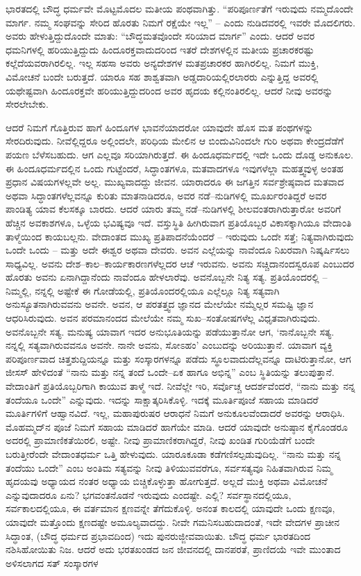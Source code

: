 ಭಾರತದಲ್ಲಿ ಬೌದ್ಧ ಧರ್ಮವೇ ಮೊಟ್ಟಮೊದಲ ಮತೀಯ ಪಂಥವಾಗಿತ್ತು. “ಪರಿಪೂರ್ಣತೆಗೆ ಇರುವುದು ನಮ್ಮದೊಂದೇ ಮಾರ್ಗ. ನಮ್ಮ ಸಂಘವನ್ನು ಸೇರಿದ ಹೊರತು ನಿಮಗೆ ರಕ್ಷೆಯೇ ಇಲ್ಲ” – ಎಂದು ನುಡಿದವರಲ್ಲಿ ಇವರೇ ಮೊದಲಿಗರು. ಅವರು ಹೇಳುತ್ತಿದ್ದುದೊಂದೇ ಮಾತು: “ಬೌದ್ಧಮತವೊಂದೇ ಸರಿಯಾದ ಮಾರ್ಗ” ಎಂದು. ಆದರೆ ಅವರ ಧಮನಿಗಳಲ್ಲಿ ಹರಿಯುತ್ತಿದ್ದುದು ಹಿಂದೂರಕ್ತವಾದುದರಿಂದ ಇತರೆ ದೇಶಗಳಲ್ಲಿನ ಮತೀಯ ಪ್ರಚಾರಕರಷ್ಟು ಕಲ್ಲೆದೆಯವರಾಗಿರಲಿಲ್ಲ. ಇಲ್ಲ ಸಹಸಾ ಅವರು ಅನ್ಯದೇಶಗಳ ಮತಪ್ರಚಾರಕರ ಹಾಗಿರಲಿಲ್ಲ. ನಿಮಗೆ ಮುಕ್ತಿ, ವಿಮೋಚನೆ ಬಂದೇ ಬರುತ್ತದೆ. ಯಾರೂ ಸಹ ಶಾಶ್ವತವಾಗಿ ಅಡ್ಡದಾರಿಯಲ್ಲಿರಲಾರರು ಎನ್ನುತ್ತಿದ್ದ ಅವರಲ್ಲಿ ಯಥೇಷ್ಟವಾಗಿ ಹಿಂದೂರಕ್ತವೇ ಹರಿಯುತ್ತಿದ್ದುದರಿಂದ ಅವರ ಹೃದಯ ಕಲ್ಲಿನಂತಿರಲಿಲ್ಲ. ಆದರೆ ನೀವು ಅವರನ್ನು ಸೇರಲೇಬೇಕು.

ಆದರೆ ನಿಮಗೆ ಗೊತ್ತಿರುವ ಹಾಗೆ ಹಿಂದೂಗಳ ಭಾವನೆಯಾದರೋ ಯಾವುದೇ ಹೊಸ ಮತ ಪಂಥಗಳನ್ನು ಸೇರದಿರುವುದು. ನೀವೆಲ್ಲಿದ್ದರೂ ಅಲ್ಲಿಂದಲೇ, ಪರಿಧಿಯ ಮೇಲಿನ ಆ ಬಿಂದುವಿನಿಂದಲೇ ಗುರಿ ಅಥವಾ ಕೇಂದ್ರದೆಡೆಗೆ ಪಯಣ ಬೆಳೆಸಬಹುದು. ಆಗ ಎಲ್ಲವೂ ಸರಿಯಾಗಿರುತ್ತದೆ. ಈ ಹಿಂದೂಧರ್ಮದಲ್ಲಿ ಇದೇ ಒಂದು ದೊಡ್ಡ ಅನುಕೂಲ. ಈ ಹಿಂದೂಧರ್ಮದಲ್ಲಿನ ಒಂದು ಗುಟ್ಟೆಂದರೆ, ಸಿದ್ಧಾಂತಗಳೂ, ಮತವಾದಗಳೂ ಇವುಗಳೆಲ್ಲಾ ಮಹತ್ತ್ವವುಳ್ಳ ಅಂತಹ ಪ್ರಧಾನ ವಿಷಯಗಳಲ್ಲವೇ ಅಲ್ಲ. ಮುಖ್ಯವಾದದ್ದು ಜೀವನ. ಯಾರಾದರೂ ಈ ಜಗತ್ತಿನ ಸರ್ವಶ್ರೇಷ್ಠವಾದ ಮತವಾದ ಅಥವಾ ಸಿದ್ಧಾಂತಗಳೆಲ್ಲವನ್ನೂ ಕುರಿತು ಮಾತನಾಡಿದರೂ, ಅವರ ನಡೆ–ನುಡಿಗಳಲ್ಲಿ ಮೂರ್ಖರಂತಿದ್ದರೆ ಅವರ ಪಾಂಡಿತ್ಯ ಯಾವ ಕೆಲಸಕ್ಕೂ ಬಾರದು. ಆದರೆ ಯಾರು ತಮ್ಮ ನಡೆ–ನುಡಿಗಳಲ್ಲಿ ಶೀಲವಂತರಾಗಿರುತ್ತಾರೋ ಅವರಿಗೆ ಹೆಚ್ಚಿನ ಅವಕಾಶಗಳೂ, ಒಳ್ಳೆಯ ಭವಿಷ್ಯವೂ ಇದೆ. ವಸ್ತುಸ್ಥಿತಿ ಹೀಗಿರುವಾಗ ಪ್ರತಿಯೊಬ್ಬರ ವಿಕಾಸಕ್ಕಾಗಿಯೂ ವೇದಾಂತಿ ತಾಳ್ಮೆಯಿಂದ ಕಾಯಬಲ್ಲನು. ವೇದಾಂತದ ಮುಖ್ಯ ಪ್ರತಿಪಾದನೆಯೆಂದರೆ – ಇರುವುದು ಒಂದೇ ಸತ್ತೆ; ನಿತ್ಯವಾಗಿರುವುದು ಒಂದೇ ಒಂದು – ಮತ್ತು ಅದೇ ಈಶ್ವರ ಅಥವಾ ದೇವರು. ಅವನ ಎಲ್ಲೆಯನ್ನು ನಾವೆಂದೂ ನಿಖರವಾಗಿ ನಿಷ್ಕರ್ಷಿಸಲು ಸಾಧ್ಯವಿಲ್ಲ. ಅವನು ದೇಶ–ಕಾಲ–ಕಾರ್ಯಕಾರಣಗಳೆಲ್ಲದರ ಆಚೆ ಇರುವನು. ಅವನು ಸಚ್ಚಿದಾನಂದಸ್ವರೂಪ ಎಂಬುದರ ಹೊರತು ಅವನು ಏನಾಗಿದ್ದಾನೆಂದು ನಾವೆಂದೂ ಹೇಳಲಾರೆವು. ಅವನೊಬ್ಬನೇ ನಿತ್ಯ ಸತ್ಯ. ಪ್ರತಿಯೊಂದರಲ್ಲಿ – ನಿಮ್ಮಲ್ಲಿ, ನನ್ನಲ್ಲಿ ಅಷ್ಟೇಕೆ ಈ ಗೋಡೆಯಲ್ಲಿ, ಪ್ರತಿಯೊಂದರಲ್ಲಿಯೂ ಎಲ್ಲೆಲ್ಲೂ ನಿತ್ಯ ಸತ್ಯವಾಗಿ ಅನುಸ್ಯೂತನಾಗಿರುವವನು ಅವನೇ. ಅವನ, ಆ ಪರತತ್ತ್ವದ ಜ್ಞಾನದ ಮೇಲೆಯೇ ನಮ್ಮೆಲ್ಲರ ಸಮಷ್ಟಿ ಜ್ಞಾನ ಆಧರಿಸಿರುವುದು. ಅವನ ಪರಮಾನಂದದ ಮೇಲೆಯೇ ನಮ್ಮ ಸುಖ–ಸಂತೋಷಗಳೆಲ್ಲ ವಿಧೃತವಾಗಿರುವುದು. ಅವನೊಬ್ಬನೇ ಸತ್ಯ. ಮನುಷ್ಯ ಯಾವಾಗ ಇದರ ಅನುಭೂತಿಯನ್ನು ಪಡೆಯುತ್ತಾನೋ ಆಗ, ‘ನಾನೊಬ್ಬನೇ ಸತ್ಯ. ನನ್ನಲ್ಲಿ ಸತ್ಯವಾಗಿರುವವನೂ ಅವನೇ. ನಾನೇ ಅವನು, ಸೋಽಹಂ’ ಎಂಬುದನ್ನು ಅರಿಯುತ್ತಾನೆ. ಯಾವಾಗ ವ್ಯಕ್ತಿ ಪರಿಪೂರ್ಣವಾದ ಚಿತ್ತಶುದ್ದಿಯನ್ನೂ ಮತ್ತು ಸಂಸ್ಕಾರಗಳನ್ನೂ ಪಡೆದು ಸ್ಥೂಲವಾದುದೆಲ್ಲವನ್ನೂ ದಾಟಿರುತ್ತಾನೋ, ಆಗ ಜೀಸಸ್ ಹೇಳಿದಂತೆ “ನಾನು ಮತ್ತು ನನ್ನ ತಂದೆ ಒಂದೇ–ಏಕ ಹಾಗೂ ಅಭಿನ್ನ” ಎಂಬ ಸ್ಥಿತಿಯನ್ನು ತಲುಪುತ್ತಾನೆ. ವೇದಾಂತಿಗೆ ಪ್ರತಿಯೊಬ್ಬರಿಗಾಗಿ ಕಾಯುವ ತಾಳ್ಮೆ ಇದೆ. ನೀವೆಲ್ಲೇ ಇರಿ, ಸರ್ವೊಚ್ಚ ಆದರ್ಶವೆಂದರೆ, “ನಾನು ಮತ್ತು ನನ್ನ ತಂದೆಯೂ ಒಂದೇ” ಎನ್ನುವುದು. ಇದನ್ನು ಸಾಕ್ಷಾತ್ಕರಿಸಿಕೊಳ್ಳಿ. ಇದಕ್ಕೆ ಮೂರ್ತಿಪೂಜೆ ಸಹಾಯ ಮಾಡಿದರೆ ಮೂರ್ತಿಗಳಿಗೆ ಆಹ್ವಾನವಿದೆ. ಇಲ್ಲ, ಮಹಾಪುರುಷರ ಆರಾಧನೆ ನಿಮಗೆ ಅನುಕೂಲವೆಂದಾದರೆ ಅವರನ್ನು ಆರಾಧಿಸಿ. ಮೊಹಮ್ಮದ್‌ನ ಪೂಜೆ ನಿಮಗೆ ಸಹಾಯ ಮಾಡಿದರೆ ಹಾಗೆಯೇ ಮಾಡಿ. ಆದರೆ ಯಾವುದೇ ಅನುಷ್ಠಾನ ಕೈಗೊಂಡರೂ ಅದರಲ್ಲಿ ಪ್ರಾಮಾಣಿಕತೆಯಿರಲಿ, ಅಷ್ಟೇ. ನೀವು ಪ್ರಾಮಾಣಿಕರಾಗಿದ್ದರೆ, ನೀವು ಖಂಡಿತ ಗುರಿಯೆಡೆಗೆ ಬಂದೇ ಬರುತ್ತೀರೆಂದೇ ವೇದಾಂತಧರ್ಮ ಒತ್ತಿ ಹೇಳುವುದು. ಯಾರೂಕೂಡಾ ಕಡೆಗಣಿಸಲ್ಪಡುವುದಿಲ್ಲ. “ನಾನು ಮತ್ತು ನನ್ನ ತಂದೆಯು ಒಂದೇ” ಎಂಬ ಅಂತಿಮ ಸತ್ಯವನ್ನು ನೀವು ತಿಳಿಯುವವರೆಗೂ, ಸರ್ವಸತ್ಯವೂ ನಿಹಿತವಾಗಿರುವ ನಿಮ್ಮ ಹೃದಯವು ಅಧ್ಯಾಯದ ನಂತರ ಅಧ್ಯಾಯ ಬಿಚ್ಚಿಕೊಳ್ಳುತ್ತಾ ಹೋಗುತ್ತದೆ. ಅಲ್ಲದೆ ಮುಕ್ತಿ ಅಥವಾ ವಿಮೋಚನೆ ಎನ್ನುವುದಾದರೂ ಏನು? ಭಗವಂತನೊಡನೆ ಇರುವುದು ಎಂದಷ್ಟೇ. ಎಲ್ಲಿ? ಸರ್ವಸ್ಥಾನದಲ್ಲಿಯೂ, ಸರ್ವಕಾಲದಲ್ಲಿಯೂ, ಈ ವರ್ತಮಾನ ಕ್ಷಣವನ್ನೇ ತೆಗೆದುಕೊಳ್ಳಿ. ಅನಂತ ಕಾಲದಲ್ಲಿ ಯಾವುದೇ ಒಂದು ಕ್ಷಣವೂ, ಯಾವುದೇ ಮತ್ತೊಂದು ಕ್ಷಣದಷ್ಟೇ ಅಮೂಲ್ಯವಾದದ್ದು. ನೀವೇ ಗಮನಿಸಬಹುದಾದಂತೆ, ಇದೇ ವೇದಗಳ ಪ್ರಾಚೀನ ಸಿದ್ಧಾಂತ, (ಬೌದ್ಧ ಧರ್ಮದ ಪ್ರಭಾವದಿಂದ) ಇದು ಪುನರುಜ್ಜೀವವಾಯಿತು. ಬೌದ್ಧ ಧರ್ಮ ಭಾರತದಿಂದ ನಶಿಸಿಹೋಯಿತು ನಿಜ. ಆದರೆ ಅದು ಭರತಖಂಡದ ಜನ ಜೀವನದಲ್ಲಿ ದಾನಪರತೆ, ಪ್ರಾಣಿದಯೆ ಇವೇ ಮುಂತಾದ ಅಳಿಸಲಾಗದ ಸತ್ ಸಂಸ್ಕಾರಗಳ 